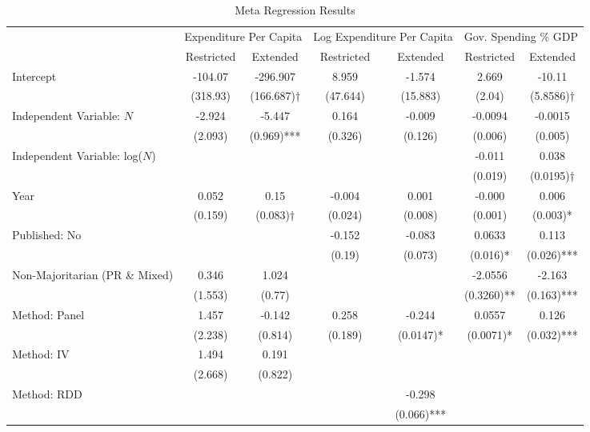 \documentclass[a4paper,12pt]{article}
\begin{document}
\begin{table}[htpb]
\footnotesize
\caption{Meta Regression Results}
\label{tab:regressions}
\centering
\begin{tabular}{lcccccc}
\toprule
\midrule
\multicolumn{1}{c}{ } & \multicolumn{2}{c}{Expenditure Per Capita} & \multicolumn{2}{c}{Log Expenditure Per Capita} & \multicolumn{2}{c}{Gov. Spending \% GDP} \\
\cmidrule(l{3pt}r{3pt}){2-3} \cmidrule(l{3pt}r{3pt}){4-5} \cmidrule(l{3pt}r{3pt}){6-7}
& Restricted & Extended & Restricted & Extended & Restricted & Extended \\
\midrule
Intercept & -104.07 & -296.907 & 8.959 & -1.574 & 2.669 & -10.11 \\
 & (318.93) & (166.687)$\dagger$ & (47.644) & (15.883) & (2.04) & (5.8586)$\dagger$\\
%
Independent Variable: $N$ & -2.924 & -5.447 & 0.164 & -0.009 & -0.0094 & -0.0015\\
 & (2.093) & (0.969)*** & (0.326) & (0.126) & (0.006) & (0.005)\\
%
Independent Variable: log($N$) &  &  &  &  & -0.011 & 0.038\\
 &  &  &  &  & (0.019) & (0.0195)$\dagger$\\
%
Year & 0.052 & 0.15 & -0.004 & 0.001 & -0.000 & 0.006\\
 & (0.159) & (0.083)$\dagger$ & (0.024) & (0.008) & (0.001) & (0.003)*\\
%
Published: No &  &  & -0.152 & -0.083 & 0.0633 & 0.113 \\
 &  &  & (0.19) & (0.073) & (0.016)* & (0.026)***\\
%
Non-Majoritarian (PR \& Mixed) & 0.346 & 1.024 & &  & -2.0556 & -2.163\\
 & (1.553) & (0.77) & &  & (0.3260)** & (0.163)***\\
%
Method: Panel & 1.457 & -0.142 & 0.258 & -0.244 & 0.0557 & 0.126\\
 & (2.238) & (0.814) & (0.189) & (0.0147)* & (0.0071)* & (0.032)***\\
%
Method: IV & 1.494 & 0.191 &  &  &  & \\
 & (2.668) & (0.822) &  &  &  & \\
%
Method: RDD &  &  &  &-0.298&  & \\
 &  &  &  & (0.066)*** &  & \\
% 
\bottomrule
\end{tabular}
\begin{minipage}{\textwidth}
\renewcommand{\footnoterule}{}
\end{minipage}
\end{table}
\end{document}
